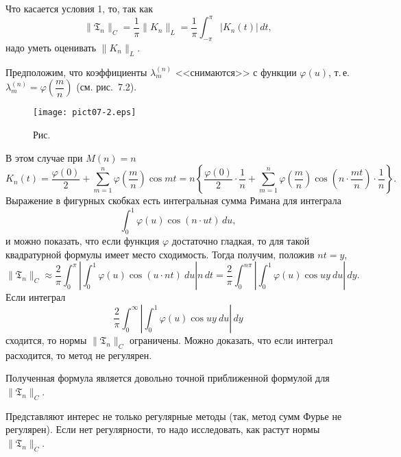Что касается условия 1, то, так как
$$
\|{\mathfrak{T}}_n\|_C=\frac{1}{\pi} \|K_n\|_L=
\frac{1}{\pi} \int_{-\pi}^{\pi} |K_n(t)|\, dt,
$$
надо уметь оценивать $\|K_n\|_L$.

Предположим, что коэффициенты $\lambda_m^{(n)}$ <<снимаются>> с функции
$\varphi(u)$, т.\,е. $\lambda_m^{(n)}=\varphi\left( \dfrac{m}{n}
\right)$ (см. {рис.~7.2}).



\begin{figure}[ht]
\begin{center}
\texttt{[image: pict07-2.eps]}
\end{center}
 \bigskip
 \label{r7-2}

 \centerline{Рис.~\theris}
 \bigskip
\end{figure}





В этом случае {при $M(n)=n$}
$$
K_n(t)=\frac{\varphi(0)}{2}+\sum\limits_{m=1}^n \varphi\left( \frac{m}{n}
\right) \cos mt=n\left\{
\frac{\varphi(0)}{2}\cdot\frac{1}{n}+\sum\limits_{m=1}^n \varphi\left(
\frac{m}{n} \right) \cos\left(n \cdot \frac{mt}{n}\right)\cdot \frac{1}{n}
\right\}.
$$
Выражение {в фигурных скобках} есть интегральная сумма Римана для интеграла
$$
\int_{0}^1\varphi(u)\cos(n\cdot ut)\, du,
$$
и можно показать, что если функция $\varphi$ достаточно гладкая, то для такой
квадратурной формулы имеет место сходимость. Тогда получим, положив
$nt=y$,
$$
\|{\mathfrak{T}}_n\|_C\approx \frac{2}{\pi} \int_0^{\pi} \left|
\int_0^1 \varphi(u) \cos(u\cdot nt)\ du \right|n\, dt=
\frac{2}{\pi} \int_0^{n\pi} \left|
\int_0^1 \varphi(u) \cos uy\ du \right|\, dy.
$$
Если интеграл
$$
\frac{2}{\pi} \int_0^{\infty} \left|
\int_0^1 \varphi(u) \cos uy \ {du}\right|\, dy
$$
сходится, то нормы $\|{\mathfrak{T}}_n\|_C$ ограничены.
Можно доказать, что если интеграл расходится, то метод {не регулярен}.

\begin{Remark}
Полученная формула является {довольно} точной приближенной формулой для
$\|{\mathfrak{T}}_n\|_C$.
\end{Remark}

Представляют интерес не только регулярные методы (так, метод сумм Фурье {не регулярен}).
Если нет регулярности, то надо исследовать, как
растут нормы $\|{\mathfrak{T}}_n\|_C$.


